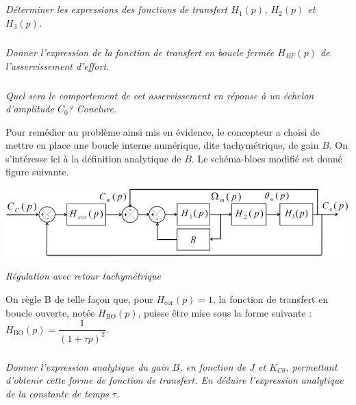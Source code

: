 \documentclass[10pt,fleqn]{article} %
\begin{document}
\subparagraph{}
\textit{Déterminer les expressions des fonctions de transfert $H_1(p)$, $H_2(p)$ et $H_3(p)$.}
\ifprof
\begin{corrige}
\end{corrige}
\else
\fi

\subparagraph{}
\textit{Donner l’expression de la fonction de transfert en boucle fermée $H_{BF}(p)$ de l’asservissement
d’effort.}

\ifprof
\begin{corrige}
\end{corrige}
\else
\fi

\subparagraph{}
\textit{Quel sera le comportement de cet asservissement en réponse à un échelon d'amplitude $C_0$?
Conclure.}
\ifprof
\begin{corrige}
\end{corrige}
\else
\fi

\vspace{.25cm}

Pour remédier au problème ainsi mis en évidence, le concepteur a choisi de mettre en place une boucle
interne numérique, dite tachymétrique, de gain $B$. On s’intéresse ici à la définition analytique de $B$.
Le schéma-blocs modifié est donné figure suivante.


\begin{center}
\includegraphics[width=.7\linewidth]{images/fig_07}

\textit{Régulation avec retour tachymétrique}
\end{center}


On règle B de telle façon que, pour $H_{\text{cor}}(p)=1$, la fonction de transfert en boucle ouverte, notée $H_{\text{BO}}(p)$, puisse être mise sous la forme suivante : 
$H_{\text{BO}}(p)=\dfrac{1}{\left(1+\tau p\right)^2}$.



\subparagraph{}
\textit{Donner l’expression analytique du gain $B$, en fonction de $J$ et $K_{C\theta}$, permettant d’obtenir cette
forme de fonction de transfert. En déduire l’expression analytique de la constante de temps $\tau$.}
\ifprof
\begin{corrige}
\end{corrige}
\else
\fi

\vspace{.25cm}
\end{document}
